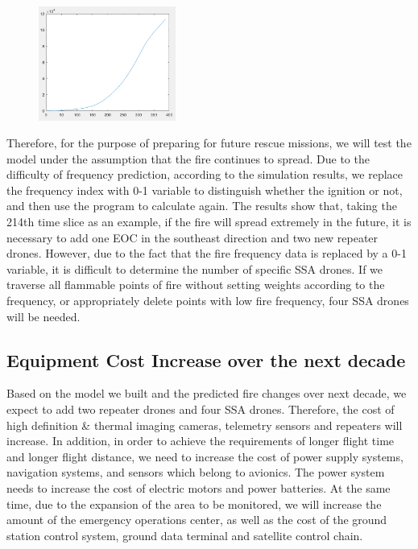 \documentclass{mcmthesis}
\begin{document}
\begin{figure}[H]
  \centering
  \includegraphics[width=0.4\textwidth]{image/18.png}
\end{figure}

Therefore, for the purpose of preparing for future rescue missions, we will test the model under the assumption that the fire continues to spread. Due to the difficulty of frequency prediction, according to the simulation results, we replace the frequency index with 0-1 variable to distinguish whether the ignition or not, and then use the program to calculate again. The results show that, taking the 214th time slice as an example, if the fire will spread extremely in the future, it is necessary to add one EOC in the southeast direction and two new repeater drones. However, due to the fact that the fire frequency data is replaced by a 0-1 variable, it is difficult to determine the number of specific SSA drones. If we traverse all flammable points of fire without setting weights according to the frequency, or appropriately delete points with low fire frequency, four SSA drones will be needed.

\subsection{Equipment Cost Increase over the next decade}
Based on the model we built and the predicted fire changes over next decade, we expect to add two repeater drones and four SSA drones. Therefore, the cost of high definition \& thermal imaging cameras, telemetry sensors and repeaters will increase. In addition, in order to achieve the requirements of longer flight time and longer flight distance, we need to increase the cost of power supply systems, navigation systems, and sensors which belong to avionics. The power system needs to increase the cost of electric motors and power batteries. At the same time, due to the expansion of the area to be monitored, we will increase the amount of the emergency operations center, as well as the cost of the ground station control system, ground data terminal and satellite control chain.
\end{document}
